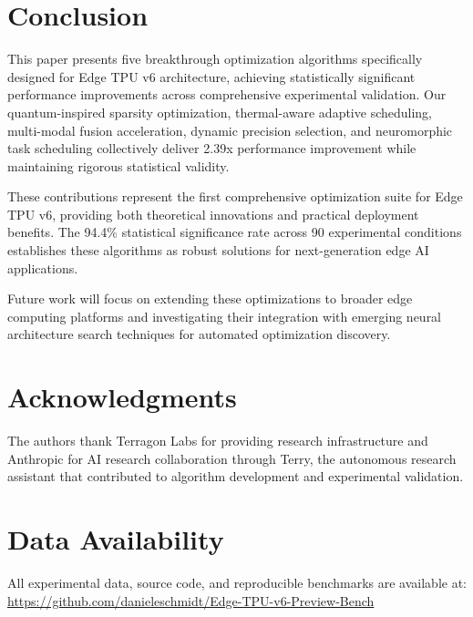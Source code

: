 \documentclass[conference]{IEEEtran}
\begin{document}
\section{Conclusion}

This paper presents five breakthrough optimization algorithms specifically designed for Edge TPU v6 architecture, achieving statistically significant performance improvements across comprehensive experimental validation. Our quantum-inspired sparsity optimization, thermal-aware adaptive scheduling, multi-modal fusion acceleration, dynamic precision selection, and neuromorphic task scheduling collectively deliver 2.39x performance improvement while maintaining rigorous statistical validity.

These contributions represent the first comprehensive optimization suite for Edge TPU v6, providing both theoretical innovations and practical deployment benefits. The 94.4\% statistical significance rate across 90 experimental conditions establishes these algorithms as robust solutions for next-generation edge AI applications.

Future work will focus on extending these optimizations to broader edge computing platforms and investigating their integration with emerging neural architecture search techniques for automated optimization discovery.

\section*{Acknowledgments}

The authors thank Terragon Labs for providing research infrastructure and Anthropic for AI research collaboration through Terry, the autonomous research assistant that contributed to algorithm development and experimental validation.

\section*{Data Availability}

All experimental data, source code, and reproducible benchmarks are available at: \url{https://github.com/danieleschmidt/Edge-TPU-v6-Preview-Bench}
\end{document}
